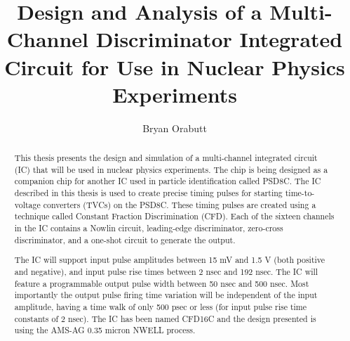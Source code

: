 \documentclass[12pt,oneside,final]{siuethesis}
\author{Bryan Orabutt}
\title{Design and Analysis of a Multi-Channel Discriminator Integrated Circuit for Use in Nuclear Physics Experiments}
\theoremstyle{definition}
\begin{document}
\maketitle 

\frontmatter %

\copyrightpage %



\begin{abstract}

\par This thesis presents the design and simulation of a multi-channel integrated circuit (IC) that will be used in nuclear physics experiments. The chip is being designed as a companion chip for another IC used in particle identification called PSD8C. The IC described in this thesis is used to create precise timing pulses for starting time-to-voltage converters (TVCs) on the PSD8C. These timing pulses are created using a technique called Constant Fraction Discrimination (CFD). Each of the sixteen channels in the IC contains a Nowlin circuit, leading-edge discriminator, zero-cross discriminator, and a one-shot circuit to generate the output. \par The IC will support input pulse amplitudes between 15 mV and 1.5 V (both positive and negative), and input pulse rise times between 2 nsec and 192 nsec. The IC will feature a programmable output pulse width between 50 nsec and 500 nsec. Most importantly the output pulse firing time variation will be independent of the input amplitude, having a time walk of only 500 psec or less (for input pulse rise time constants of 2 nsec). The IC has been named CFD16C and the design presented is using the AMS-AG 0.35 micron NWELL process.
\end{abstract}


\end{document}
